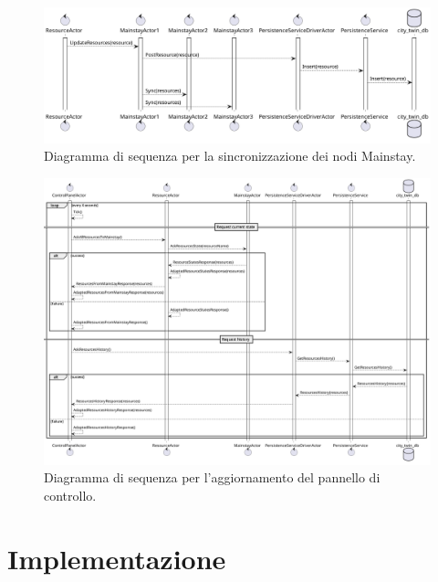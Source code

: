 \documentclass[12pt]{article}
\begin{document}
\begin{figure}[h]
    \caption{Diagramma di sequenza per la sincronizzazione dei nodi Mainstay.}
    \includegraphics[width=\textwidth]{../assets/images/core-mainstays-sync-sequence-diagram.png}
\end{figure}

\begin{figure}[h]
    \caption{Diagramma di sequenza per l'aggiornamento del pannello di controllo.}
    \includegraphics[width=\textwidth]{../assets/images/control-panel-sequence-diagram.png}
\end{figure}

\newpage


\section{Implementazione}\label{sec:implementazione}
\end{document}
